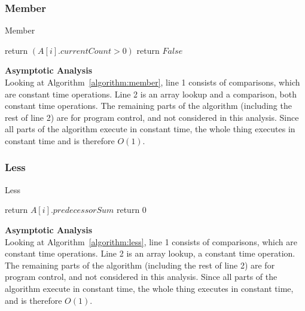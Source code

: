 \documentclass[letterpaper, 10pt,DIV=13]{scrartcl}
\numberwithin{equation}{section} %
\numberwithin{figure}{section} %
\numberwithin{table}{section} %
\begin{document}
\subsubsection{Member}

\begin{algorithm}[H]
    \SetAlgoLined
    \caption{Member}
    \label{algorithm:member}
     
     {
        return $(A[i].currentCount > 0)$\;
    } {
        return $False$\;
   }
\end{algorithm}

\textbf{Asymptotic Analysis}\\
Looking at Algorithm~\ref{algorithm:member}, line 1 consists of comparisons, which are constant time operations.
Line 2 is an array lookup and a comparison, both constant time operations.
The remaining parts of the algorithm (including the rest of line 2) are for program control, and not considered in this analysis. Since all parts of the algorithm execute in constant time, the whole thing executes in constant time and is therefore $O(1)$.

\subsubsection{Less}

\begin{algorithm}[H]
    \SetAlgoLined
    \caption{Less}
    \label{algorithm:less}
     
     {
        return $A[i].predecessorSum$\;
    } {
        return 0\;
   }
\end{algorithm}

\textbf{Asymptotic Analysis}\\
Looking at Algorithm~\ref{algorithm:less}, line 1 consists of comparisons, which are constant time operations.
Line 2 is an array lookup, a constant time operation.
The remaining parts of the algorithm (including the rest of line 2) are for program control, and not considered in this analysis. Since all parts of the algorithm execute in constant time, the whole thing executes in constant time, and is therefore $O(1)$.
\end{document}
